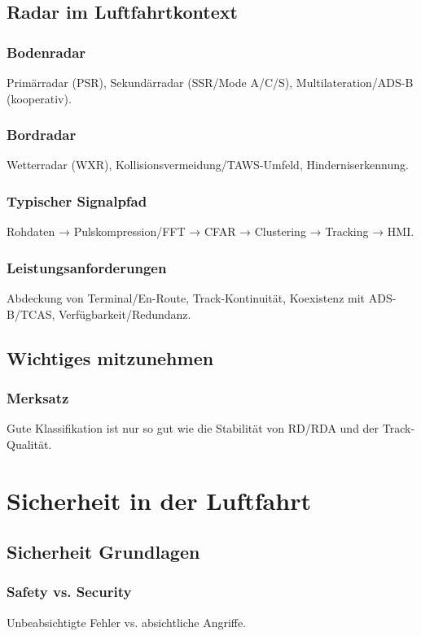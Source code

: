 \section{Radar im Luftfahrtkontext}

\subsection{Bodenradar}
Primärradar (PSR), 
Sekundärradar (SSR/Mode A/C/S), 
Multilateration/ADS-B (kooperativ).

\subsection{Bordradar}
Wetterradar (WXR), 
Kollisionsvermeidung/TAWS-Umfeld, 
Hinderniserkennung.

\subsection{Typischer Signalpfad}
Rohdaten → Pulskompression/FFT → CFAR → Clustering → Tracking → HMI.

\subsection{Leistungsanforderungen}
Abdeckung von Terminal/En-Route, Track-Kontinuität, 
Koexistenz mit ADS-B/TCAS, Verfügbarkeit/Redundanz.


\section{Wichtiges mitzunehmen}
\subsection{Merksatz}
Gute Klassifikation ist nur so gut wie die Stabilität von RD/RDA und der Track-Qualität.








\chapter{Sicherheit in der Luftfahrt}
\section{Sicherheit Grundlagen} 

\subsection{Safety vs. Security}
Unbeabsichtigte Fehler vs. absichtliche Angriffe.

